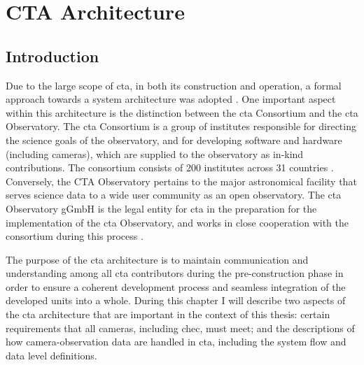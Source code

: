 \chapter{\label{ch3-architecture}CTA Architecture} 

\minitoc


\section{Introduction}

Due to the large scope of \gls{cta}, in both its construction and operation, a formal approach towards a system architecture was adopted \cite{Dazzi2018}. One important aspect within this architecture is the distinction between the \gls{cta} Consortium and the \gls{cta} Observatory. The \gls{cta} Consortium is a group of institutes responsible for directing the science goals of the observatory, and for developing software and hardware (including cameras), which are supplied to the observatory as in-kind contributions. The consortium consists of 200 institutes across 31 countries \cite{cta-consortium}. Conversely, the CTA Observatory pertains to the major astronomical facility that serves science data to a wide user community as an open observatory. The \gls{cta} Observatory gGmbH is the legal entity for \gls{cta} in the preparation for the implementation of the \gls{cta} Observatory, and works in close cooperation with the consortium during this process \cite{cta-observatory}.

The purpose of the \gls{cta} architecture is to maintain communication and understanding among all \gls{cta} contributors during the pre-construction phase in order to ensure a coherent development process and seamless integration of the developed units into a whole. During this chapter I will describe two aspects of the \gls{cta} architecture that are important in the context of this thesis: certain requirements that all cameras, including \gls{chec}, must meet; and the descriptions of how camera-observation data are handled in \gls{cta}, including the system flow and data level definitions.

